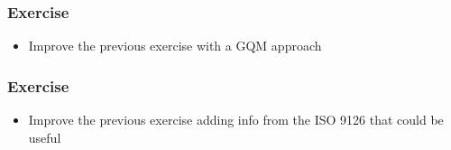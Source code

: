 \begin{frame}
\frametitle{Exercise}

\begin{itemize}
\item Improve the previous exercise with a GQM approach
\end{itemize}
\end{frame}


\begin{frame}
\frametitle{Exercise}

\begin{itemize}
\item Improve the previous exercise adding info from the ISO 9126 that could be useful
\end{itemize}
\end{frame}



